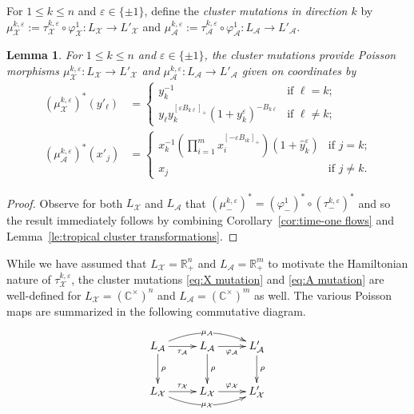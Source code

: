 \documentclass{amsart}
\newtheorem{lemma}[theorem]{Lemma}
\numberwithin{equation}{section}
\newcommand{\cA}{\mathcal{A}}
\newcommand{\cX}{\mathcal{X}}
\newcommand{\CC}{\mathbb{C}}
\newcommand{\RR}{\mathbb{R}}
\begin{document}
For $1\le k\le n$ and $\varepsilon\in\{\pm1\}$, define the \emph{cluster mutations in direction $k$} by $\mu_\cX^{k,\varepsilon}:=\tau_\cX^{k,\varepsilon}\circ\varphi_\cX^1:L_\cX\to L'_\cX$ and $\mu_\cA^{k,\varepsilon}:=\tau_\cA^{k,\varepsilon}\circ\varphi_\cA^1:L_\cA\to L'_\cA$.
\begin{lemma}
  \label{le:cluster mutation}
  For $1\le k\le n$ and $\varepsilon\in\{\pm1\}$, the cluster mutations provide Poisson morphisms $\mu_\cX^{k,\varepsilon}:L_\cX\to L'_\cX$ and $\mu_\cA^{k,\varepsilon}:L_\cA\to L'_\cA$ given on coordinates by
  \begin{align}
    \label{eq:X mutation}
    (\mu_\cX^{k,\varepsilon})^*(y'_\ell)&=\begin{cases} y_k^{-1} & \text{if $\ell=k$;}\\ y_\ell y_k^{[\varepsilon B_{k\ell}]_+}(1+y_k^\varepsilon)^{-B_{k\ell}} & \text{if $\ell\ne k$;}\end{cases}\\
    \label{eq:A mutation}
    (\mu_\cA^{k,\varepsilon})^*(x'_j)&=\begin{cases} x_k^{-1}\left(\prod\limits_{i=1}^m x_i^{[-\varepsilon B_{ik}]_+}\right)(1+\hat y_k^\varepsilon) & \text{if $j=k$;}\\ x_j & \text{if $j\ne k$.}\end{cases}
  \end{align}
\end{lemma}
\begin{proof}
  Observe for both $L_\cX$ and $L_\cA$ that $(\mu_-^{k,\varepsilon})^*=(\varphi_-^1)^*\circ(\tau_-^{k,\varepsilon})^*$ and so the result immediately follows by combining Corollary~\ref{cor:time-one flows} and Lemma~\ref{le:tropical cluster transformations}.
\end{proof}

While we have assumed that $L_\cX=\RR_+^n$ and $L_\cA=\RR_+^m$ to motivate the Hamiltonian nature of $\tau_\cX^{k,\varepsilon}$, the cluster mutations \eqref{eq:X mutation} and \eqref{eq:A mutation} are well-defined for $L_\cX= (\CC^\times)^n$ and $L_\cA= (\CC^\times)^m$ as well. The various Poisson maps are summarized in the following commutative diagram.

\begin{equation} \label{eq:PoisCD}
	\xymatrix{
	L_\cA \ar[d]^{\rho} \ar[r]_{\tau_\cA} \ar@/^1pc/[rr]|-{\mu_\cA} & L_\cA \ar[d]^{\rho} \ar[r]_{\varphi_\cA} & L'_\cA \ar[d]^{\rho} \\
	L_\cX \ar[r]^{\tau_\cX} \ar@/_1pc/[rr]|-{\mu_\cX} & L_\cX \ar[r]^{\varphi_\cX} & L'_\cX
	}
\end{equation}
\end{document}
